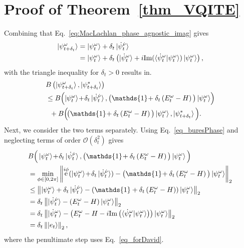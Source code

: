 \documentclass[twocolumn, aps, pra, superscriptaddress]{revtex4-1}
\DeclareMathOperator{\ee}{e}
\newcommand{\norm}[1]{\left\lVert#1\right\rVert}
\begin{document}
\section{Proof of Theorem~\ref{thm_VQITE}} \label{app:proofThm2}
Combining that Eq.~\eqref{eq:MacLachlan_phase_agnostic_imag} gives
    \begin{align} 
  \ket{\psi^{\omega}_{t+\delta_t}  }&= \ket{\psi^{\omega}_t  } + \delta_t\ket{\dot\psi^{\dot\nu}_t} \nonumber   \\
  &=\ket{\psi^{\omega}_t  } + \delta_t\left(\ket{\dot\psi^{\omega}_t} + i\text{Im}(\braket{\dot\psi^{\omega}_t|\psi^{\omega}_t})\ket{\psi^{\omega}_t}\right),
    \end{align}
 with the triangle inequality for $\delta_t > 0$ results in. 
\begin{align}
    &B\left(\ket{\psi^{\omega}_{t+\delta_t}}, \ket{\psi^*_{t+\delta_t}}\right) \nonumber \\ 
      &\hspace{0mm}\leq B\Big(\!\ket{\psi^{\omega}_t  } \!+\! \delta_t\ket{\dot\psi^{\dot\nu}_{t}}, \big(\mathds{1}\!+\delta_t\left(E_t^{\omega}-H\right)\big)\ket{\psi^{\omega}_t}\! \Big)\nonumber  \\
      &\hspace{2mm}+B\Big(\!\big(\mathds{1}\!+\delta_t\left(E_t^{\omega}-H\right)\big)\ket{\psi^{\omega}_t}, \ket{\psi^*_{t+\delta_t}}\Big) . \label{eq_triangle_start_qite}
\end{align}
Next, we consider the two terms separately.
Using Eq.~\eqref{eq_buresPhase} and neglecting terms of order $\mathcal{O}(\delta_t^2)$ gives
\begin{align}
     &B\Big(\ket{\psi^{\omega}_t  } \!+\! \delta_t\ket{\dot\psi^{\dot\nu}_{t}}, \big(\mathds{1}\!+\delta_t\left(E_t^{\omega}-H\right)\big)\ket{\psi^{\omega}_t} \Big) \nonumber \\
     &=\min_{\phi \in [0,2\pi]}\norm{\ee^{i\phi}(\ket{\psi^{\omega}_t  } \!+\! \delta_t\ket{\dot\psi^{\dot\nu}_{t}}) - \big(\mathds{1}\!+\delta_t\left(E_t^{\omega}-H\right)\big)\ket{\psi^{\omega}_t}}_2 \nonumber\\
     &\leq\norm{\ket{\psi^{\omega}_t} + \delta_t\ket{\dot\psi^{\dot\nu}_{t}}  - \left(\mathds{1}+\delta_t\left(E_t^{\omega}-H\right)\right)\ket{\psi^{\omega}_t}}_2  \nonumber\\
     &= \delta_t \norm{\ket{\dot\psi^{\dot\nu}_{t}}  - \left(E_t^{\omega}-H\right)\ket{\psi^{\omega}_t}}_2  \nonumber\\
     &=\delta_t \norm{\ket{\dot\psi^{\omega}_t}  - \left(E_t^{\omega}-H-i\text{Im}\left(\braket{\dot\psi^{\omega}_t|\psi^{\omega}_t}\right)\right)\ket{\psi^{\omega}_t}
    }_2 \nonumber \\
     &= \delta_t\norm{\ket{e_t}}_2, \label{eq_triangle_part1_qite}
\end{align}
where the penultimate step uses Eq.~\eqref{eq_forDavid}.
\end{document}
